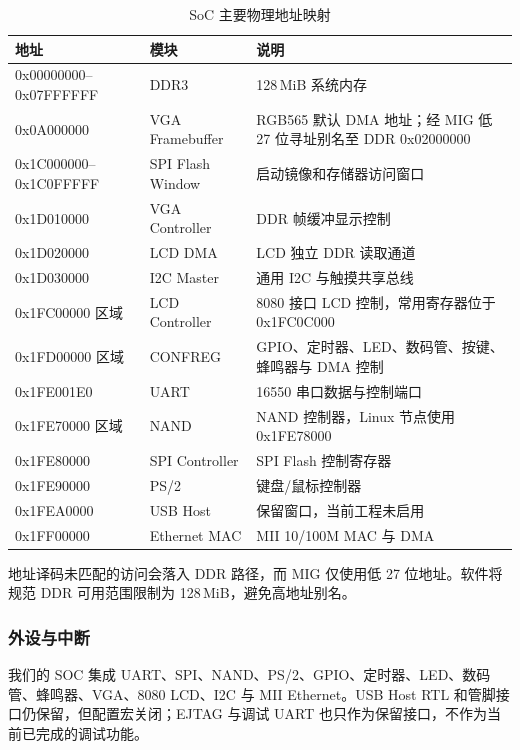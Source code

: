 \begin{table}[H]
\centering
\caption{SoC 主要物理地址映射}
\label{tab:addr}
\scriptsize
\begin{tabularx}{\textwidth}{>{\ttfamily}p{3.4cm}>{\raggedright\arraybackslash}p{3.2cm}X}
\toprule
地址 & 模块 & 说明 \\
\midrule
0x00000000--0x07FFFFFF & DDR3 & 128\,MiB 系统内存 \\
0x0A000000 & VGA Framebuffer & RGB565 默认 DMA 地址；经 MIG 低 27 位寻址别名至 DDR 0x02000000 \\
0x1C000000--0x1C0FFFFF & SPI Flash Window & 启动镜像和存储器访问窗口 \\
0x1D010000 & VGA Controller & DDR 帧缓冲显示控制 \\
0x1D020000 & LCD DMA & LCD 独立 DDR 读取通道 \\
0x1D030000 & I2C Master & 通用 I2C 与触摸共享总线 \\
0x1FC00000 区域 & LCD Controller & 8080 接口 LCD 控制，常用寄存器位于 0x1FC0C000 \\
0x1FD00000 区域 & CONFREG & GPIO、定时器、LED、数码管、按键、蜂鸣器与 DMA 控制 \\
0x1FE001E0 & UART & 16550 串口数据与控制端口 \\
0x1FE70000 区域 & NAND & NAND 控制器，Linux 节点使用 0x1FE78000 \\
0x1FE80000 & SPI Controller & SPI Flash 控制寄存器 \\
0x1FE90000 & PS/2 & 键盘/鼠标控制器 \\
0x1FEA0000 & USB Host & 保留窗口，当前工程未启用 \\
0x1FF00000 & Ethernet MAC & MII 10/100M MAC 与 DMA \\
\bottomrule
\end{tabularx}
\end{table}

地址译码未匹配的访问会落入 DDR 路径，而 MIG 仅使用低 27 位地址。软件将规范 DDR 可用范围限制为 128\,MiB，避免高地址别名。

\subsubsection{外设与中断}

我们的 SOC 集成 UART、SPI、NAND、PS/2、GPIO、定时器、LED、数码管、蜂鸣器、VGA、8080 LCD、I2C 与 MII Ethernet。USB Host RTL 和管脚接口仍保留，但配置宏关闭；EJTAG 与调试 UART 也只作为保留接口，不作为当前已完成的调试功能。

